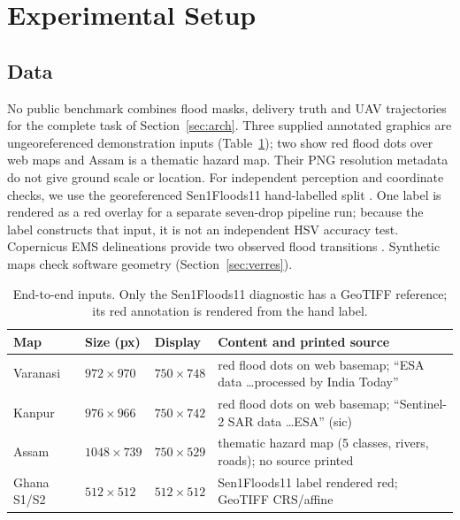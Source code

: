 \section{Experimental Setup}
\label{sec:setup}

\subsection{Data}
\label{sec:data}
No public benchmark combines flood masks, delivery truth and UAV trajectories for the complete task of Section~\ref{sec:arch}. Three supplied annotated graphics are ungeoreferenced demonstration inputs (Table~\ref{tab:data}); two show red flood dots over web maps and Assam is a thematic hazard map. Their PNG resolution metadata do not give ground scale or location. For independent perception and coordinate checks, we use the georeferenced Sen1Floods11 hand-labelled split \cite{bonafilia2020sen1floods11}. One label is rendered as a red overlay for a separate seven-drop pipeline run; because the label constructs that input, it is not an independent HSV accuracy test. Copernicus EMS delineations provide two observed flood transitions \cite{cems_emsr504}. Synthetic maps check software geometry (Section~\ref{sec:verres}).

\begin{table}[t]
\centering
\caption{End-to-end inputs. Only the Sen1Floods11 diagnostic has a GeoTIFF reference; its red annotation is rendered from the hand label.}
\label{tab:data}
\footnotesize
\setlength{\tabcolsep}{2.5pt}
\begin{tabular}{@{}lllp{3.5cm}@{}}
\toprule
Map & Size (px) & Display & Content and printed source\\
\midrule
Varanasi & $972\times970$ & $750\times748$ & red flood dots on web basemap; ``ESA data \ldots processed by India Today''\\
Kanpur & $976\times966$ & $750\times742$ & red flood dots on web basemap; ``Sentinel-2 SAR data \ldots ESA'' (sic)\\
Assam & $1048\times739$ & $750\times529$ & thematic hazard map (5 classes, rivers, roads); no source printed\\
Ghana S1/S2 & $512\times512$ & $512\times512$ & Sen1Floods11 label rendered red; GeoTIFF CRS/affine\\
\bottomrule
\end{tabular}
\end{table}

